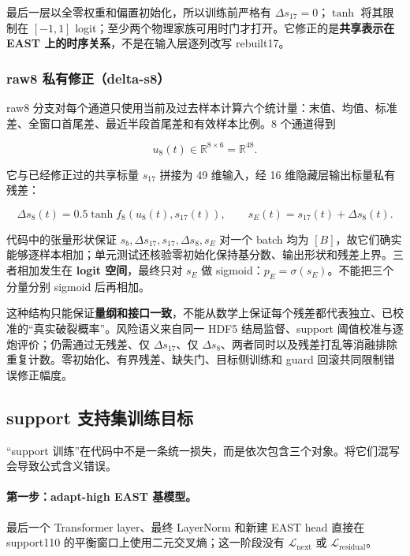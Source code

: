 \documentclass[11pt,a4paper]{article}
\begin{document}
最后一层以全零权重和偏置初始化，所以训练前严格有 \(\Delta s_{17}=0\)；\(\tanh\) 将其限制在 \([-1,1]\) logit；至少两个物理家族可用时门才打开。它修正的是\textbf{共享表示在 EAST 上的时序关系}，不是在输入层逐列改写 rebuilt17。

\subsubsection{raw8 私有修正（delta-s8）}

raw8 分支对每个通道只使用当前及过去样本计算六个统计量：末值、均值、标准差、全窗口首尾差、最近半段首尾差和有效样本比例。8 个通道得到

\[
u_8(t)\in\mathbb{R}^{8\times6}=\mathbb{R}^{48}.
\]

它与已经修正过的共享标量 \(s_{17}\) 拼接为 49 维输入，经 16 维隐藏层输出标量私有残差：

\begin{equation}
\Delta s_8(t)=0.5\tanh f_8\!\left(u_8(t),s_{17}(t)\right),
\qquad
s_E(t)=s_{17}(t)+\Delta s_8(t).
\label{eq:private-adapter}
\end{equation}

代码中的张量形状保证 \(s_b,\Delta s_{17},s_{17},\Delta s_8,s_E\) 对一个 batch 均为 \([B]\)，故它们确实能够逐样本相加；单元测试还核验零初始化保持基分数、输出形状和残差上界。三者相加发生在 \textbf{logit 空间}，最终只对 \(s_E\) 做 sigmoid：\(p_E=\sigma(s_E)\)。不能把三个分量分别 sigmoid 后再相加。

这种结构只能保证\textbf{量纲和接口一致}，不能从数学上保证每个残差都代表独立、已校准的“真实破裂概率”。风险语义来自同一 HDF5 结局监督、support 阈值校准与逐炮评价；仍需通过无残差、仅 \(\Delta s_{17}\)、仅 \(\Delta s_8\)、两者同时以及残差打乱等消融排除重复计数。零初始化、有界残差、缺失门、目标侧训练和 guard 回滚共同限制错误修正幅度。

\subsection{support 支持集训练目标}

“support 训练”在代码中不是一条统一损失，而是依次包含三个对象。将它们混写会导致公式含义错误。

\paragraph{第一步：adapt-high EAST 基模型。}
最后一个 Transformer layer、最终 LayerNorm 和新建 EAST head 直接在 support110 的平衡窗口上使用二元交叉熵；这一阶段没有 \(\mathcal{L}_{\mathrm{next}}\) 或 \(\mathcal{L}_{\mathrm{residual}}\)。
\end{document}
